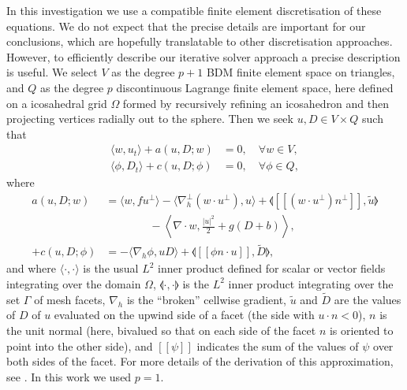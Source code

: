\documentclass[a4paper]{article}
\newcommand{\jump}[1]{[\![#1]\!]}
\begin{document}
In this investigation we use a compatible finite element
discretisation of these equations. We do not expect that the precise
details are important for our conclusions, which are hopefully
translatable to other discretisation approaches. However, to
efficiently describe our iterative solver approach a precise
description is useful. We select $V$ as the degree $p+1$ BDM finite
element space on triangles, and $Q$ as the degree $p$ discontinuous
Lagrange finite element space, here defined on a icosahedral grid
$\Omega$ formed by recursively refining an icosahedron and then projecting
vertices radially out to the sphere. Then we seek $u,D\in V\times Q$
such that
\begin{align}
  \label{eq:ut}
  \langle w, u_t \rangle + a(u,D;w) 
   & = 0,
  \quad \forall w \in V, \\
  \label{eq:Dt}
  \langle \phi, D_t \rangle
+ c(u,D; \phi) & =
 0, \quad \forall \phi \in Q,
\end{align}
where
\begin{align}
   a(u,D;w) 
&=
  \langle w, fu^\perp \rangle 
  - \langle \nabla_h^\perp (w\cdot u^\perp), u \rangle
  + \llangle \jump{(w\cdot u^\perp) n^\perp}, \tilde{u} \rrangle \nonumber  \\
& \qquad \qquad - \left\langle \nabla\cdot w, \frac{|u|^2}{2} + g(D+b) \right\rangle, \\
  + c(u,D; \phi) &=
  - \langle \nabla_h \phi, uD \rangle
  + \llangle \jump{\phi n\cdot u}, \tilde{D} \rrangle,
\end{align}
and where $\langle \cdot , \cdot \rangle$ is the usual $L^2$ inner product
defined for scalar or vector fields integrating over the domain
$\Omega$, $\llangle\cdot,\cdot \rrangle$ is the $L^2$ inner product
integrating over the set $\Gamma$ of mesh facets, $\nabla_h$ is the
``broken'' cellwise gradient, $\tilde{u}$ and $\tilde{D}$ are the
values of $D$ of $u$ evaluated on the upwind side of a facet (the side
with $u\cdot n<0$), $n$ is the unit normal (here, bivalued so that on
each side of the facet $n$ is oriented to point into the other side),
and $\jump{\psi}$ indicates the sum of the values of $\psi$ over both
sides of the facet. For more details of the derivation of this approximation,
see \cite{gibson2019compatible}. In this work we used $p=1$.
\end{document}
